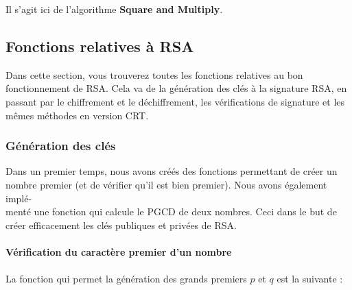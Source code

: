 \documentclass[12pt]{article}
\theoremstyle{remark}\newtheorem{note}{Note}
\theoremstyle{remark}\newtheorem{nota}{Notation}
\theoremstyle{definition}
\begin{document}
Il s'agit ici de l'algorithme \textbf{Square and Multiply}.


\pagebreak

\subsection{Fonctions relatives à RSA}

Dans cette section, vous trouverez toutes les fonctions relatives au bon fonctionnement de RSA. Cela va de la génération des clés à la signature RSA, en passant par le chiffrement et le déchiffrement, les vérifications de signature et les mêmes méthodes en version CRT.

\subsubsection{Génération des clés}
Dans un premier temps, nous avons créés des fonctions permettant de créer un nombre premier (et de vérifier qu'il est bien premier). Nous avons également implé-\\
menté une fonction qui calcule le PGCD de deux nombres. Ceci dans le but de créer efficacement les clés publiques et privées de RSA.\\\\
\textbf{Vérification du caractère premier d'un nombre}\\\\
La fonction qui permet la génération des grands premiers $p$ et $q$ est la suivante :
\end{document}
